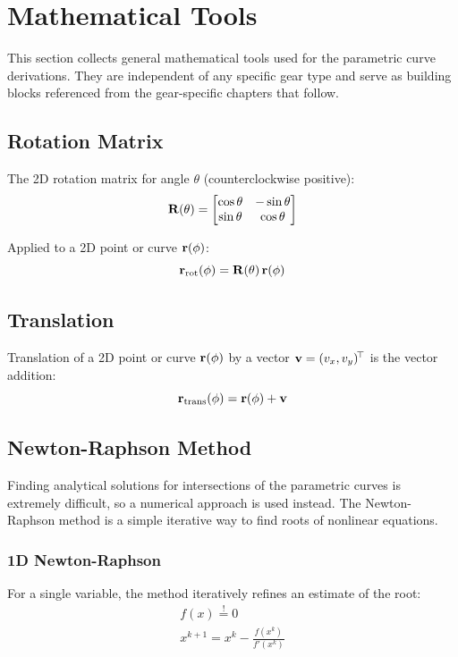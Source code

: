 \section{Mathematical Tools}
\label{sec:mathematical_tools}

This section collects general mathematical tools used for the parametric curve derivations. They are independent of any specific gear type and serve as building blocks referenced from the gear-specific chapters that follow.

\subsection{Rotation Matrix}
\label{subsec:rotation_matrix}
The 2D rotation matrix for angle $\theta$ (counterclockwise positive):
\begin{equation}
    \vb{R}(\theta) = \begin{bmatrix}
        \cos\theta & -\sin\theta \\
        \sin\theta & \cos\theta
    \end{bmatrix}
\end{equation}

Applied to a 2D point or curve $\vb{r}(\phi)$:
\begin{equation}
    \vb{r}_{\text{rot}}(\phi) = \vb{R}(\theta)\,\vb{r}(\phi)
\end{equation}

\subsection{Translation}
\label{subsec:translation}
Translation of a 2D point or curve $\vb{r}(\phi)$ by a vector $\vb{v} = (v_x, v_y)^{\!\top}$ is the vector addition:
\begin{equation}
    \vb{r}_{\text{trans}}(\phi) = \vb{r}(\phi) + \vb{v}
\end{equation}

\subsection{Newton-Raphson Method}
\label{subsec:newton_raphson}
Finding analytical solutions for intersections of the parametric curves is extremely difficult, so a numerical approach is used instead. The Newton-Raphson method is a simple iterative way to find roots of nonlinear equations.

\subsubsection{1D Newton-Raphson}
For a single variable, the method iteratively refines an estimate of the root:
\begin{equation}
\begin{gathered}
f(x) \stackrel{!}{=} 0 \\
x^{k+1} = x^k - \frac{f(x^k)}{f'(x^k)}
\end{gathered}
\label{eq:1D_newton_raphson}
\end{equation}

